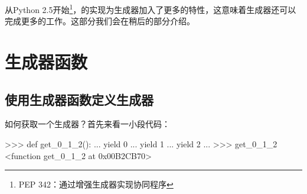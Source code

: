 \documentclass[12pt,a4paper]{report}
\begin{document}
从Python 2.5开始\footnote{PEP 342：通过增强生成器实现协同程序}，的实现为生成器加入了更多的特性，这意味着生成器还可以完成更多的工作。这部分我们会在稍后的部分介绍。

\section{生成器函数}
\subsection{使用生成器函数定义生成器} 
如何获取一个生成器？首先来看一小段代码：
\begin{python}[moreemph={[4]42},caption={},label=ex1]
>>> def get_0_1_2():
...   yield 0
...   yield 1
...   yield 2
...
>>> get_0_1_2
<function get_0_1_2 at 0x00B2CB70>
\end{python}
\end{document}
